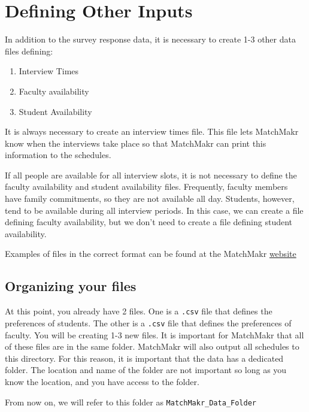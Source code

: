 \chapter{Defining Other Inputs}

In addition to the survey response data, it is necessary to create 1-3 other data files defining:
\begin{enumerate}
	\item Interview Times
	\item Faculty availability
	\item Student Availability
\end{enumerate}

It is always necessary to create an interview times file.  This file lets MatchMakr know when the interviews take place so that MatchMakr can print this information to the schedules.

If all people are available for all interview slots, it is not necessary to define the faculty availability and student availability files.  Frequently, faculty members have family commitments, so they are not available all day.  Students, however, tend to be available during all interview periods.  In this case, we can create a file defining faculty availability, but we don't need to create a file defining student availability.

Examples of files in the correct format can be found at the MatchMakr \href{https://sites.google.com/case.edu/matchmakr/home}{website}



%
%
\section{Organizing your files}
At this point, you already have 2 files.  One is a \texttt{.csv} file that defines the preferences of students.  The other is a \texttt{.csv} file that defines the preferences of faculty.  You will be creating 1-3 new files.  It is important for MatchMakr that all of these files are in the same folder.  MatchMakr will also output all schedules to this directory.  For this reason, it is important that the data has a dedicated folder.  The location and name of the folder are not important so long as you know the location, and you have access to the folder.

From now on, we will refer to this folder as \texttt{MatchMakr\_Data\_Folder}


